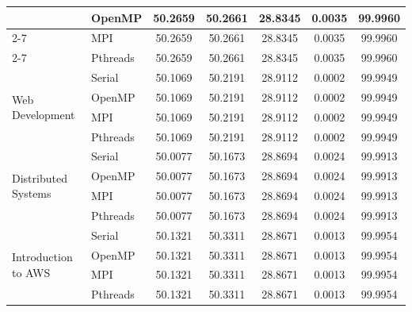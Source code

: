 \documentclass[12pt,a4paper]{article}
\begin{document}
\begin{table}[H]
\begin{tabular}{|p{3.8cm}|l|c|c|c|c|c|}
 & OpenMP & 50.2659 & 50.2661 & 28.8345 & 0.0035 & 99.9960 \\ \cline{2-7}
 & MPI & 50.2659 & 50.2661 & 28.8345 & 0.0035 & 99.9960 \\ \cline{2-7}
 & Pthreads & 50.2659 & 50.2661 & 28.8345 & 0.0035 & 99.9960 \\ \hline
\multirow{4}{3.8cm}{Web Development} & Serial & 50.1069 & 50.2191 & 28.9112 & 0.0002 & 99.9949 \\ \cline{2-7}
 & OpenMP & 50.1069 & 50.2191 & 28.9112 & 0.0002 & 99.9949 \\ \cline{2-7}
 & MPI & 50.1069 & 50.2191 & 28.9112 & 0.0002 & 99.9949 \\ \cline{2-7}
 & Pthreads & 50.1069 & 50.2191 & 28.9112 & 0.0002 & 99.9949 \\ \hline
\multirow{4}{3.8cm}{Distributed Systems} & Serial & 50.0077 & 50.1673 & 28.8694 & 0.0024 & 99.9913 \\ \cline{2-7}
 & OpenMP & 50.0077 & 50.1673 & 28.8694 & 0.0024 & 99.9913 \\ \cline{2-7}
 & MPI & 50.0077 & 50.1673 & 28.8694 & 0.0024 & 99.9913 \\ \cline{2-7}
 & Pthreads & 50.0077 & 50.1673 & 28.8694 & 0.0024 & 99.9913 \\ \hline
\multirow{4}{3.8cm}{Introduction to AWS} & Serial & 50.1321 & 50.3311 & 28.8671 & 0.0013 & 99.9954 \\ \cline{2-7}
 & OpenMP & 50.1321 & 50.3311 & 28.8671 & 0.0013 & 99.9954 \\ \cline{2-7}
 & MPI & 50.1321 & 50.3311 & 28.8671 & 0.0013 & 99.9954 \\ \cline{2-7}
 & Pthreads & 50.1321 & 50.3311 & 28.8671 & 0.0013 & 99.9954 \\ \hline
\end{tabular}
\end{table}

\clearpage
\end{document}
